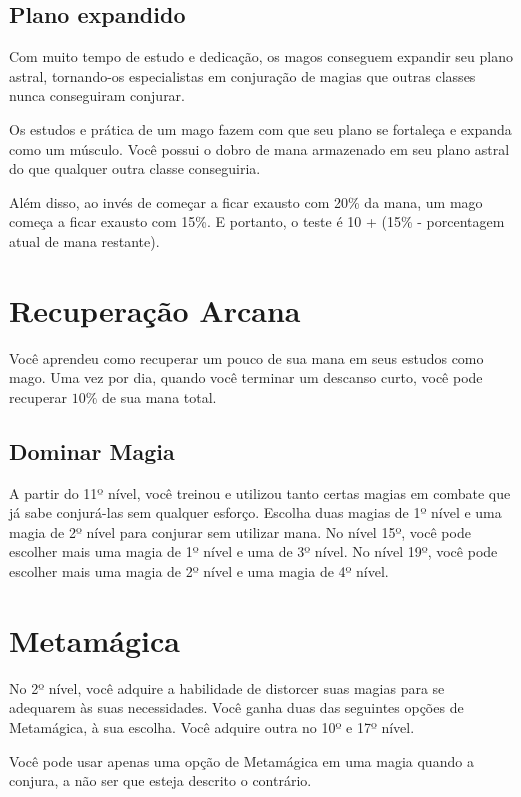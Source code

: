 \documentclass{RPG_Adventure}[2021/10/20]
\begin{document}
\begin{multicols}{2}
\subsection*{Plano expandido}%

Com muito tempo de estudo e dedicação, os magos conseguem expandir seu plano
astral, tornando-os especialistas em conjuração de magias que outras classes
nunca conseguiram conjurar.

Os estudos e prática de um mago fazem com que seu plano se fortaleça e expanda
como um músculo. Você possui o dobro de mana armazenado em seu plano astral do
que qualquer outra classe conseguiria.

Além disso, ao invés de começar a ficar exausto com 20\% da mana, um mago
começa a ficar exausto com 15\%. E portanto, o teste é 10 + (15\% - porcentagem
atual de mana restante).

\section*{Recuperação Arcana}%

Você aprendeu como recuperar um pouco de sua mana em seus estudos como mago. Uma
vez por dia, quando você terminar um descanso curto, você pode recuperar $10\%$
de sua mana total.

\subsection*{Dominar Magia}%

A partir do 11º nível, você treinou e utilizou tanto certas magias em combate
que já sabe conjurá-las sem qualquer esforço. Escolha duas magias de 1º nível e
uma magia de 2º nível para conjurar sem utilizar mana. No nível 15º, você pode
escolher mais uma magia de 1º nível e uma de 3º nível. No nível 19º, você pode
escolher mais uma magia de 2º nível e uma magia de 4º nível.

\section*{Metamágica}%

No 2º nível, você adquire a habilidade de distorcer suas magias para se
adequarem às suas necessidades. Você ganha duas das seguintes opções de
Metamágica, à sua escolha. Você adquire outra no 10º e 17º nível.

Você pode usar apenas uma opção de Metamágica em uma magia quando a conjura, a
não ser que esteja descrito o contrário.


\end{multicols}
\end{document}
